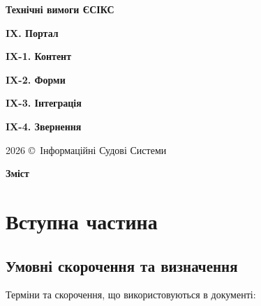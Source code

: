 \documentclass{article}
\newcommand\HUGE[1]{\fontsize{40}{40}\selectfont #1}
\begin{document}
\pagestyle{fancy}

\begin{titlepage}
  \AddToShipoutPictureBG*{\AtPageLowerLeft{\color{nato}\rule{\paperwidth}{\paperheight}}}
  \color{white}\thispagestyle{empty}\vspace*{4cm}\centering
  {\Huge  \textbf{Технічні вимоги ЄСІКС} \par} \vspace{2cm}
  {\HUGE  \textbf{IX. Портал} \par} \vspace{2.5cm}
  {\LARGE \textbf{IX-1. Контент} \par}
  {\LARGE \textbf{IX-2. Форми} \par}
  {\LARGE \textbf{IX-3. Інтеграція} \par}
  {\LARGE \textbf{IX-4. Звернення} \par} \vspace{2.5cm}
  \vfill
  {\large 2026 \copyright\ Інформаційні Судові Системи \par}
\end{titlepage}

\newpage

\begin{center}
  {\Huge\color{nato}\bfseries Зміст\par}
\end{center}
\vspace{40pt}
\tableofcontents

\begin{abstract}
ТЕХНІЧНІ ВИМОГИ НА СТВОРЕННЯ ЗАСОБУ ІНФОРМАТИЗАЦІЇ - КОМПОНЕНТІВ “ПОРТАЛ”, ІНФОРМАЦІЙНО-ПОШУКОВОЇ ПІДСИСТЕМИ
ЄДИНОЇ СУДОВОЇ ІНФОРМАЦІЙНО-КОМУНІКАЦІЙНОЇ СИСТЕМИ.
\end{abstract}

\newpage
\section*{Вступна частина}

\subsection*{Умовні скорочення та визначення}

Терміни та скорочення, що використовуються в документі:
\end{document}
